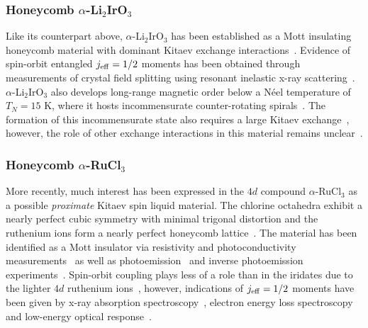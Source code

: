 %
%
\subsubsection{Honeycomb $\alpha$-Li$_2$IrO$_3$}
%
%
Like its counterpart above, $\alpha$-Li$_2$IrO$_3$ has been established as a Mott insulating honeycomb material with dominant Kitaev exchange interactions~\cite{KobayashiJMC2003,SinghPRL2012}.
Evidence of spin-orbit entangled $j_{\rm eff} = 1/2$ moments has been obtained through measurements of crystal field splitting using resonant inelastic x-ray scattering~\cite{GretarssonPRL2013}.
$\alpha$-Li$_2$IrO$_3$ also develops long-range magnetic order below a  N\'eel temperature of $T_N = 15$ K, where it hosts incommensurate counter-rotating spirals~\cite{SinghPRL2012,WilliamsPRB2016}.
The formation of this incommensurate state also requires a large Kitaev exchange~\cite{WilliamsPRB2016}, however, the role of other exchange interactions in this material remains unclear~\cite{WinterJOP2017}.


%
%
\subsubsection{Honeycomb $\alpha$-RuCl$_3$}
%
%
More recently, much interest has been expressed in the $4d$ compound $\alpha$-RuCl$_3$ as a possible \textit{proximate} Kitaev spin liquid material.
The chlorine octahedra exhibit a nearly perfect cubic symmetry with minimal trigonal distortion and the ruthenium ions form a nearly perfect honeycomb lattice~\cite{TrebstARXIV2017}.
The material has been identified as a Mott insulator via resistivity and photoconductivity measurements~\cite{BinottoPSS1971} as well as photoemission~\cite{ZhouPRB2016,KoitzschPRL2016,SinnSciRep2016} and inverse photoemission experiments~\cite{SinnSciRep2016}.
Spin-orbit coupling plays less of a role than in the iridates due to the lighter $4d$ ruthenium ions~\cite{JohnsonPRB2015}, however, indications of $j_{\rm eff} = 1/2$ moments have been given by x-ray absorption spectroscopy~\cite{PlumbPRB2014,LampenPRL2017}, electron energy loss spectroscopy~\cite{KoitzschPRL2016} and low-energy optical response~\cite{SandilandsPRB2016}.

